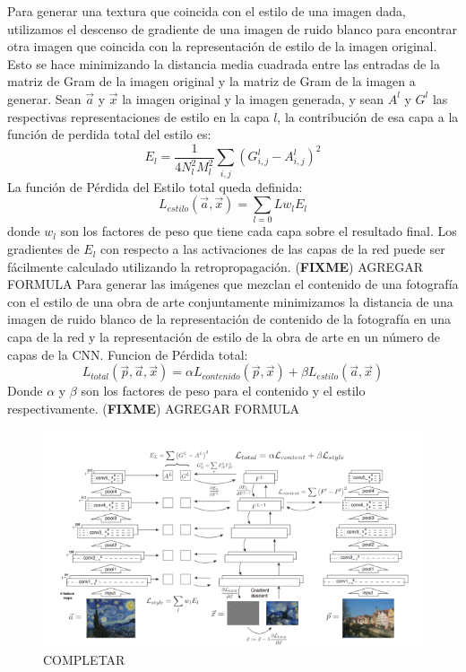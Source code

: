 \documentclass[a4paper,11pt,spanish]{book}
\newcommand*{\FIXME}[1]{{(\textbf{FIXME}) {#1}}}
\begin{document}
      Para generar una textura que coincida con el estilo de una imagen dada, utilizamos el descenso de gradiente de una imagen de ruido blanco para encontrar otra imagen que coincida
      con la representación de estilo de la imagen original. Esto se hace minimizando la distancia media cuadrada entre las entradas de la matriz de Gram de la imagen
      original y la matriz de Gram de la imagen a generar. Sean $\overrightarrow{a}$ y $\overrightarrow{x}$ la imagen original y la imagen generada, y sean $A^l$ y $G^l$
      las respectivas representaciones de estilo en la capa $l$, la contribución de esa capa a la función de perdida total del estilo es:
      \begin{equation}
       E_l = \frac{1}{4 N_l^2 M_l^2} \sum_{i,j} (G_{i,j}^l - A_{i,j}^l)^2
      \end{equation}
      La función de Pérdida del Estilo total queda definida:
      \begin{equation}
       L_{estilo}(\overrightarrow{a},\overrightarrow{x}) = \sum_{l=0}{L} w_l E_l
      \end{equation}
      donde $w_l$ son los factores de peso que tiene cada capa sobre el resultado final. Los gradientes de $E_l$ con respecto a las activaciones de las capas de la red puede ser fácilmente
      calculado utilizando la retropropagación.
      \FIXME{AGREGAR FORMULA}
      Para generar las imágenes que mezclan el contenido de una fotografía con el estilo de una obra de arte conjuntamente minimizamos la distancia de una imagen de ruido blanco
      de la representación de contenido de la fotografía en una capa de la red y la representación de estilo de la obra de arte en un número de capas de la CNN.
      Funcion de Pérdida total:
      \begin{equation}
       L_{total}(\overrightarrow{p},\overrightarrow{a},\overrightarrow{x}) = \alpha L_{contenido}(\overrightarrow{p},\overrightarrow{x}) + \beta L_{estilo}(\overrightarrow{a},\overrightarrow{x})
      \end{equation}
      Donde $\alpha$ y $\beta$ son los factores de peso para el contenido y el estilo respectivamente.
      \FIXME{AGREGAR FORMULA}\\
      \begin{figure}[h]
	\includegraphics[scale=0.8]{./img/gatys_2.png}
	\caption{COMPLETAR}
	\label{fig:gatys_2}
      \end{figure}
\end{document}
